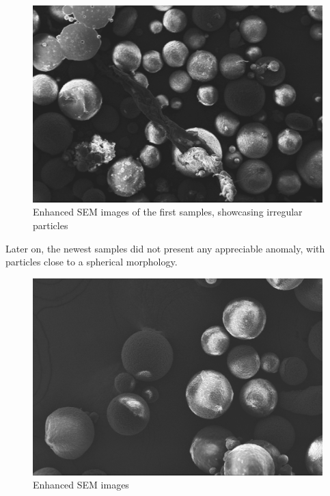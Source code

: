 \documentclass{article}
\begin{document}
                \begin{figure}[h!]
                    \centering 
                    \includegraphics[width=\textwidth]{Pictures/SEM/Edited/06_02.png}
                    \caption{Enhanced SEM images of the first samples, showcasing irregular particles \autocites{Pixelmator_Pro}{GIMP}}
                    \label{fig:SEM_irregular_particles3}
                \end{figure}

            Later on, the newest samples did not present any appreciable anomaly, with particles close to a spherical morphology. 

                \begin{figure}[h!]
                    \centering 
                    \includegraphics[width=\textwidth]{Pictures/SEM/Edited/05_03.png}
                    \caption{Enhanced SEM images \autocites{Pixelmator_Pro}{GIMP}}
                    \label{fig:SEM_particles1}
                \end{figure}
            
\end{document}
